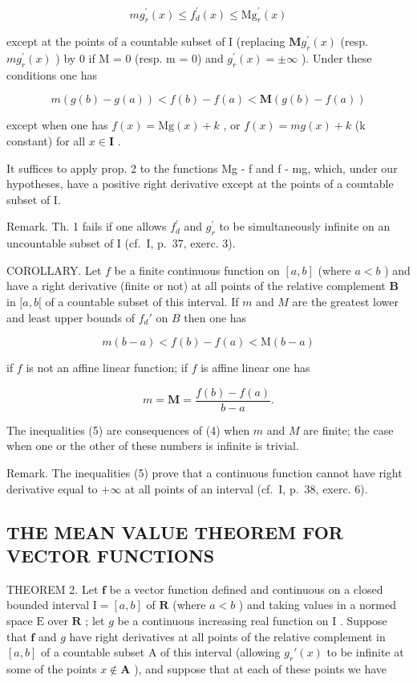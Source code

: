 \[
m g _ {r} ^ {\prime} (x) \leqslant f _ {d} ^ {\prime} (x) \leqslant \mathrm{Mg} _ {r} ^ {\prime} (x)\tag{3}
\]

except at the points of a countable subset of I (replacing \(\mathbf{M}g_{r}^{\prime}(x)\) (resp. \(mg_{r}^{\prime}(x)\) ) by 0 if M = 0 (resp. m = 0) and \(g_{r}^{\prime}(x) = \pm\infty\) ). Under these conditions one has

\[
m (g (b) - g (a)) <   f (b) - f (a) <   \mathbf {M} (g (b) - f (a))\tag{4}
\]

except when one has \(f(x) = \mathrm{Mg}(x) + k\) , or \(f(x) = mg(x) + k\) (k constant) for all \(x \in \mathbf{I}\) .

It suffices to apply prop. 2 to the functions Mg - f and f - mg, which, under our hypotheses, have a positive right derivative except at the points of a countable subset of I.

Remark. Th. 1 fails if one allows \(f_{d}^{\prime}\) and \(g_{r}^{\prime}\) to be simultaneously infinite on an uncountable subset of I (cf.~I, p.~37, exerc. 3).

COROLLARY. Let \(f\) be a finite continuous function on \([a, b]\) (where \(a < b\) ) and have a right derivative (finite or not) at all points of the relative complement \(\mathbf{B}\) in \([a, b[\) of a countable subset of this interval. If \(m\) and \(M\) are the greatest lower and least upper bounds of \(f_d'\) on \(B\) then one has

\[
m (b - a) <   f (b) - f (a) <   \mathrm{M} (b - a)\tag{5}
\]

if \(f\) is not an affine linear function; if \(f\) is affine linear one has

\[
m = \mathbf {M} = \frac {f (b) - f (a)}{b - a}.
\]

The inequalities (5) are consequences of (4) when \(m\) and \(M\) are finite; the case when one or the other of these numbers is infinite is trivial.

Remark. The inequalities (5) prove that a continuous function cannot have right derivative equal to \(+\infty\) at all points of an interval (cf.~I, p.~38, exerc. 6).

\subsection{THE MEAN VALUE THEOREM FOR VECTOR FUNCTIONS}

THEOREM 2. Let \(\mathbf{f}\) be a vector function defined and continuous on a closed bounded interval \(\mathrm{I} = [a, b]\) of \(\mathbf{R}\) (where \(a < b\) ) and taking values in a normed space \(\mathrm{E}\) over \(\mathbf{R}\) ; let \(g\) be a continuous increasing real function on \(\mathrm{I}\) . Suppose that \(\mathbf{f}\) and \(g\) have right derivatives at all points of the relative complement in \([a, b]\) of a countable subset A of this interval (allowing \(g_r'(x)\) to be infinite at some of the points \(x \notin \mathbf{A}\) ), and suppose that at each of these points we have

